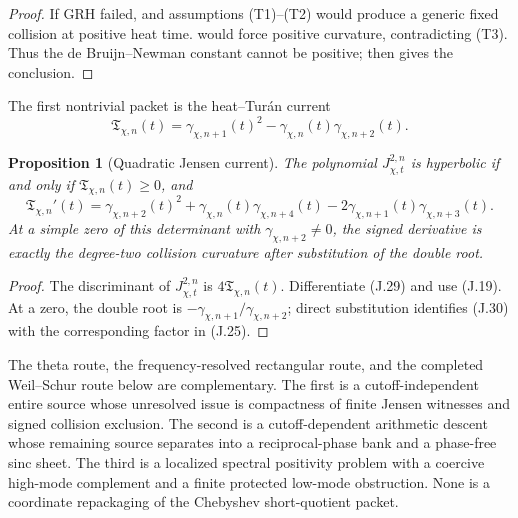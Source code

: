 \documentclass[11pt]{article}
\newtheorem{proposition}[theorem]{Proposition}
\theoremstyle{definition}
\theoremstyle{remark}
\begin{document}
\begin{proof}
If GRH failed,  and assumptions
\textup{(T1)}--\textup{(T2)} would produce a generic fixed collision at
positive heat time.   would force positive
curvature, contradicting \textup{(T3)}.  Thus the de Bruijn--Newman constant
cannot be positive;  then gives the conclusion.
\end{proof}

The first nontrivial packet is the heat--Tur\'an current
\[
 \mathfrak T_{\chi,n}(t)
 =\gamma_{\chi,n+1}(t)^2
  -\gamma_{\chi,n}(t)\gamma_{\chi,n+2}(t).
 \tag{J.29}
\]

\begin{proposition}[Quadratic Jensen current]
\label{prop:theta-quadratic-Jensen}
The polynomial $J_{\chi,t}^{2,n}$ is hyperbolic if and only if
$\mathfrak T_{\chi,n}(t)\ge0$, and
\[
 \boxed{
 \mathfrak T_{\chi,n}'(t)
 =\gamma_{\chi,n+2}(t)^2
  +\gamma_{\chi,n}(t)\gamma_{\chi,n+4}(t)
  -2\gamma_{\chi,n+1}(t)\gamma_{\chi,n+3}(t).}
 \tag{J.30}
\]
At a simple zero of this determinant with $\gamma_{\chi,n+2}\ne0$, the
signed derivative is exactly the degree-two collision curvature after
substitution of the double root.
\end{proposition}

\begin{proof}
The discriminant of $J_{\chi,t}^{2,n}$ is
$4\mathfrak T_{\chi,n}(t)$.  Differentiate \textup{(J.29)} and use
\textup{(J.19)}.  At a zero, the double root is
$-\gamma_{\chi,n+1}/\gamma_{\chi,n+2}$; direct substitution identifies
\textup{(J.30)} with the corresponding factor in \textup{(J.25)}.
\end{proof}

The theta route, the frequency-resolved rectangular route, and the completed
Weil--Schur route below are complementary.  The first is a cutoff-independent
entire source whose unresolved issue is compactness of finite Jensen witnesses
and signed collision exclusion.  The second is a cutoff-dependent arithmetic
descent whose remaining source separates into a reciprocal-phase bank and a
phase-free sinc sheet.  The third is a localized spectral positivity problem
with a coercive high-mode complement and a finite protected low-mode
obstruction.  None is a coordinate repackaging of the Chebyshev
short-quotient packet.

\end{document}
